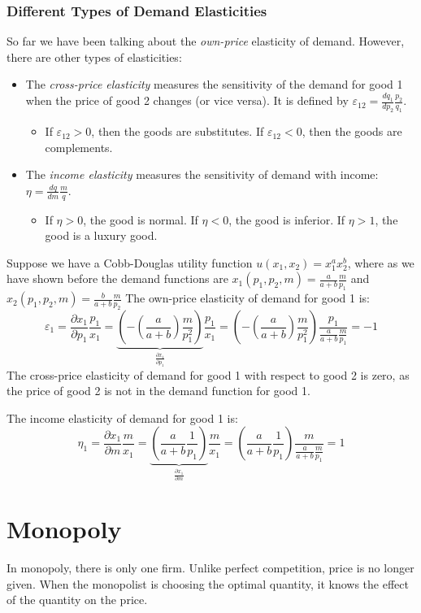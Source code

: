 \documentclass{article}
\begin{document}
\subsubsection*{Different Types of Demand Elasticities}
So far we have been talking about the \emph{own-price} elasticity of demand. However, there are other types of elasticities:
\begin{itemize}
  \item The \emph{cross-price elasticity} measures the sensitivity of the demand
    for good 1 when the price of good 2 changes (or vice versa). It is defined
    by $\varepsilon_{12} = \frac{dq_1}{dp_2}\frac{p_2}{q_1}$.
    \begin{itemize}
      \item If $ \varepsilon_{12}>0$, then the goods are
        substitutes. If $\varepsilon_{12}<0$, then the goods are
        complements.
    \end{itemize}
  \item The \emph{income elasticity} measures the sensitivity of demand with
    income: $\eta=\frac{dq}{dm}\frac{m}{q}$.
    \begin{itemize}
      \item If $\eta>0$, the good is normal. If $\eta<0$, the good is inferior.
        If $\eta>1$, the good is a luxury good.
    \end{itemize}
\end{itemize}
Suppose we have a Cobb-Douglas utility function $u\left( x_1,x_2 \right)=x_1^ax_2^b$, where as we have shown before the demand functions are $x_1\left( p_1,p_2,m \right)=\frac{a}{a+b}\frac{m}{p_1}$ and $x_2\left( p_1,p_2,m \right)=\frac{b}{a+b}\frac{m}{p_2}$
The own-price elasticity of demand for good 1 is:
\[
  \varepsilon_1 = \frac{\partial x_1}{\partial p_1}\frac{p_1}{x_1}=\underbrace{\left(-\left( \frac{a}{a+b} \right)\frac{m}{p_1^2}\right)}_{\frac{\partial x_1}{\partial  p_1}}\frac{p_1}{x_1}=\left(-\left( \frac{a}{a+b} \right)\frac{m}{p_1^2}\right)\frac{p_1}{\frac{a}{a+b}\frac{m}{p_1}}=-1
\]
The cross-price elasticity of demand for good 1 with respect to good 2 is zero, as the price of good 2 is not in the demand function for good 1.

The income elasticity of demand for good 1 is:
\[  \eta_1 =
  \frac{\partial x_1}{\partial m}\frac{m}{x_1}=\underbrace{\left( \frac{a}{a+b}\frac{1}{p_1}\right)}_{\frac{\partial x_1}{\partial  m}}\frac{m}{x_1}=
  \left( \frac{a}{a+b}\frac{1}{p_1}\right)\frac{m}{\frac{a}{a+b}\frac{m}{p_1}} = 1
\]
\section{Monopoly}
In monopoly, there is only one firm. Unlike perfect competition, price is no longer given. When the monopolist is choosing the optimal quantity, it knows the effect of the quantity on the price.
\end{document}
